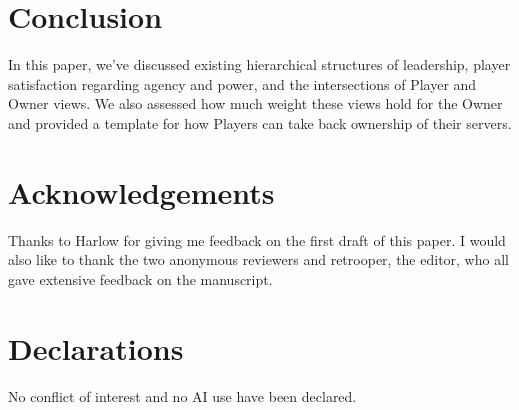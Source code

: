 \section{Conclusion}
In this paper, we’ve discussed existing hierarchical structures of leadership, player satisfaction regarding agency and power, and the intersections of Player and Owner views. We also assessed how much weight these views hold for the Owner and provided a template for how Players can take back ownership of their servers.

\section{Acknowledgements}
Thanks to Harlow for giving me feedback on the first draft of this paper. I would also like to thank the two anonymous reviewers and retrooper, the editor, who all gave extensive feedback on the manuscript.

\section{Declarations}
No conflict of interest and no AI use have been declared.